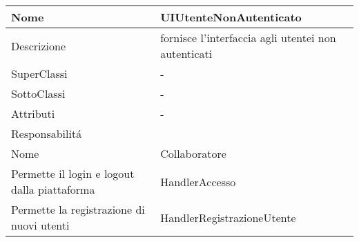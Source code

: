 \begin{center} %
    \begin{longtable}{ |p{3cm}|p{3cm}|p{3cm}|p{3cm}| }
        \hline
        Nome & \multicolumn{3}{|p{9cm}|}{UIUtenteNonAutenticato} \\\hline
        Descrizione & \multicolumn{3}{|p{9cm}|}{fornisce l'interfaccia agli utentei non autenticati} \\\hline
        SuperClassi & \multicolumn{3}{|p{9cm}|}{-} \\\hline
        SottoClassi & \multicolumn{3}{|p{9cm}|}{-} \\\hline
        Attributi & \multicolumn{3}{|p{9cm}|}{-} \\\hline
        \multicolumn{4}{|p{12cm}|}{Responsabilit\'a} \\\hline %
        \multicolumn{2}{|p{6cm}|}{Nome} & \multicolumn{2}{|p{6cm}|}{Collaboratore} \\\hline %
        \multicolumn{2}{|p{6cm}|}{Permette il login e logout dalla piattaforma} & \multicolumn{2}{|p{6cm}|}{HandlerAccesso} \\\hline
        \multicolumn{2}{|p{6cm}|}{Permette la registrazione di nuovi utenti} & \multicolumn{2}{|p{6cm}|}{HandlerRegistrazioneUtente} \\\hline
        
    \end{longtable}
\end{center}

        
